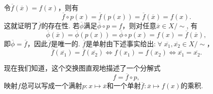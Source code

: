 \documentclass[color=green,mathpazo,titlestyle=hang]{elegantbook}
\begin{document}
\newpage
\begin{newproof}
	令$\overline{f}(\overline{x})=f(x)$，则有
	\[
	\overline{f}\circ p(x)=\overline{f}(p(x))=\overline{f}(\overline{x})=f(x).
	\]
	这就证明了$\overline{f}$的存在性. 若$\overline{\phi}$满足$\overline{\phi}\circ p=f$，则对任意$\overline{x}\in X/\sim$, 有
	\[
	\overline{\phi}(\overline{x})=\overline{\phi}(p(x))=\overline{\phi}\circ p(x)=f(x)=\overline{f}(\overline{x}),
	\]
	即$\overline{\phi}=\overline{f}$，因此$\overline{f}$是唯一的. $\overline{f}$是单射由下述事实给出:$\;\forall\;\overline{x_1},\overline{x_2}\in X/\sim$，
	\[
	\overline{f}(\overline{x_1})=\overline{f}(\overline{x_2})\iff
	f(x_1)=f(x_2)\iff \overline{x_1}=\overline{x_2}.
	\] 
\end{newproof}
现在我们知道，这个交换图直观地描述了一个分解式
\begin{equation}
	f=\overline{f}\circ p,
\end{equation}
映射$f$总可以写成一个满射$p:x\longmapsto\overline{x}$和一个单射$\overline{f}:\overline{x}\longmapsto f(x)$的乘积.



\end{document}

